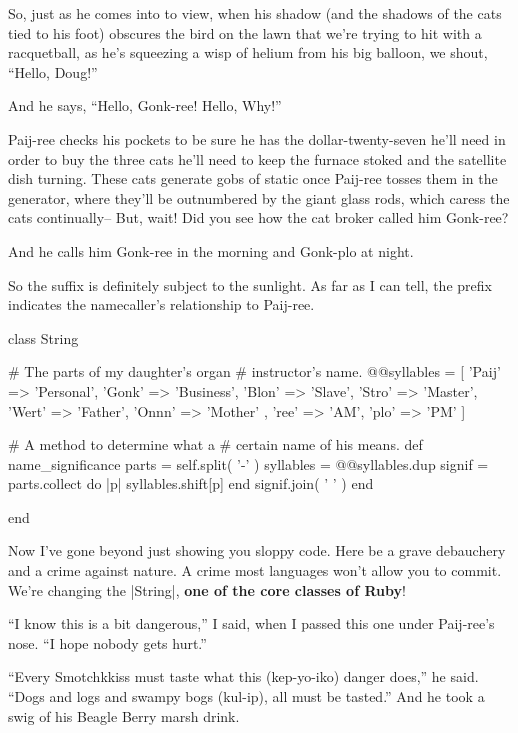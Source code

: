 \documentclass[12pt,twoside]{report}
\begin{document}
So, just as he comes into to view, when his shadow (and the shadows of
the cats tied to his foot) obscures the bird on the lawn that we're
trying to hit with a racquetball, as he's squeezing a wisp of helium
from his big balloon, we shout, ``Hello, Doug!''

And he says, ``Hello, Gonk-ree!  Hello, Why!''

Paij-ree checks his pockets to be sure he has the dollar-twenty-seven
he'll need in order to buy the three cats he'll need to keep the
furnace stoked and the satellite dish turning.  These cats generate
gobs of static once Paij-ree tosses them in the generator, where
they'll be outnumbered by the giant glass rods, which caress the cats
continually-- But, wait!  Did you see how the cat broker called him
Gonk-ree?

And he calls him Gonk-ree in the morning and Gonk-plo at night.

So the suffix is definitely subject to the sunlight.  As far as I can
tell, the prefix indicates the namecaller's relationship to Paij-ree.


\begin{rubycode}

 class String

   # The parts of my daughter's organ
   # instructor's name.
   @@syllables = [
     { 'Paij' => 'Personal',
       'Gonk' => 'Business',
       'Blon' => 'Slave',
       'Stro' => 'Master',
       'Wert' => 'Father',
       'Onnn' => 'Mother' },
     { 'ree'  => 'AM',
       'plo'  => 'PM' }
   ]

   # A method to determine what a
   # certain name of his means.
   def name_significance
     parts = self.split( '-' )
     syllables = @@syllables.dup
     signif = parts.collect do |p|
       syllables.shift[p]
     end
     signif.join( ' ' )
   end

 end

\end{rubycode}


Now I've gone beyond just showing you sloppy code.  Here be a grave
debauchery and a crime against nature.  A crime most languages won't
allow you to commit.  We're changing the
\rubyinline|String|, {\bf one of the core classes of
  Ruby}!

``I know this is a bit dangerous,'' I said, when I passed this one
under Paij-ree's nose. ``I hope nobody gets hurt.''

``Every Smotchkkiss must taste what this (kep-yo-iko) danger does,''
he said.  ``Dogs and logs and swampy bogs (kul-ip), all must be
tasted.''  And he took a swig of his Beagle Berry marsh drink.
\end{document}
